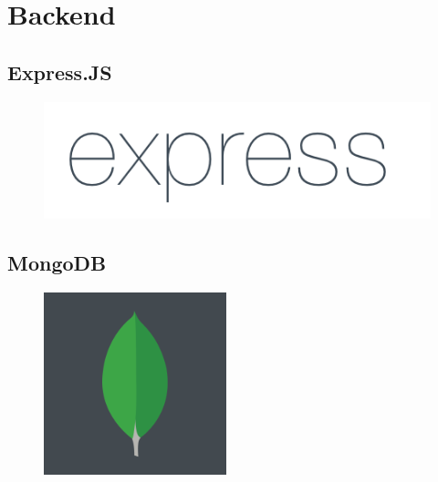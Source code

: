 \chapter{Backend}

\section{Express.JS}

\lipsum[1]
\begin{figure}
	\includegraphics[width=0.19\paperwidth]{./img/express}
\end{figure}
\lipsum[1]

\section{MongoDB}

\lipsum[1]
\begin{figure}
	\includegraphics[width=0.19\paperwidth]{./img/mongodb}
\end{figure}
\lipsum[1]